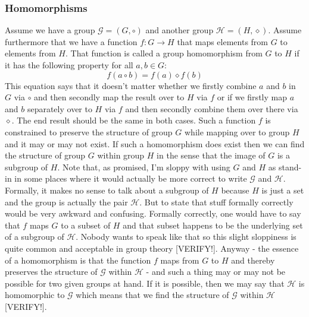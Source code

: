 \subsubsection{Homomorphisms}

Assume we have a group $\mathcal{G} = (G, \circ)$ and another group $\mathcal{H} = (H, \diamond)$. Assume furthermore that we have a function $f: G \rightarrow H$ that maps elements from $G$ to elements from $H$. That function is called a group homomorphism from $G$ to $H$ if it has the following property for all $a,b \in G$:
\begin{equation}
	f(a \circ b) = f(a) \diamond f(b)
\end{equation}
This equation says that it doesn't matter whether we firstly combine $a$ and $b$ in $G$ via $\circ$ and then secondly map the result over to $H$ via $f$ or if we firstly map $a$ and $b$ separately over to $H$ via $f$ and then secondly combine them over there via $\diamond$. The end result should be the same in both cases. Such a function $f$ is constrained to preserve the structure of group $G$ while mapping over to group $H$ and it may or may not exist. If such a homomorphism does exist then we can find the structure of group $G$ within group $H$ in the sense that the image of $G$ is a subgroup of $H$. Note that, as promised, I'm sloppy with using $G$ and $H$ as stand-in in some places where it would actually be more correct to write $\mathcal{G}$ and $\mathcal{H}$. Formally, it makes no sense to talk about a subgroup of $H$ because $H$ is just a set and the group is actually the pair $\mathcal{H}$. But to state that stuff formally correctly would be very awkward and confusing. Formally correctly, one would have to say that $f$ maps $G$ to a subset of $H$ and that subset happens to be the underlying set of a subgroup of $\mathcal{H}$. Nobody wants to speak like that so this slight sloppiness is quite common and acceptable in group theory [VERIFY!]. Anyway - the essence of a homomorphism is that the function $f$ maps from $G$ to $H$ and thereby preserves the structure of $\mathcal{G}$ within $\mathcal{H}$ - and such a thing may or may not be possible for two given groups at hand. If it is possible, then we may say that $\mathcal{H}$ is homomorphic to $\mathcal{G}$ which means that we find the structure of $\mathcal{G}$ within $\mathcal{H}$ [VERIFY!].

